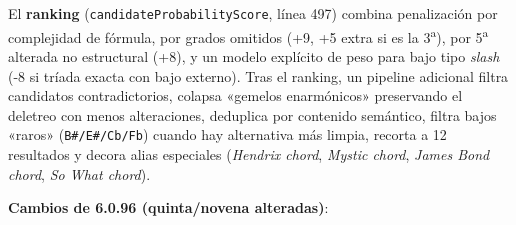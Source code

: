 \documentclass[a4paper,11pt,oneside]{report}
\begin{document}
El \textbf{ranking} (\lstinline!candidateProbabilityScore!, línea 497) combina penalización por complejidad de fórmula, por grados omitidos (+9, +5 extra si es la 3\textsuperscript{a}), por 5\textsuperscript{a} alterada no estructural (+8), y un modelo explícito de peso para bajo tipo \textit{slash} (-8 si tríada exacta con bajo externo). Tras el ranking, un pipeline adicional filtra candidatos contradictorios, colapsa «gemelos enarmónicos» preservando el deletreo con menos alteraciones, deduplica por contenido semántico, filtra bajos «raros» (\lstinline!B#/E#/Cb/Fb!) cuando hay alternativa más limpia, recorta a 12 resultados y decora alias especiales (\textit{Hendrix chord}, \textit{Mystic chord}, \textit{James Bond chord}, \textit{So What chord}).

\textbf{Cambios de 6.0.96 (quinta/novena alteradas)}:
\end{document}

